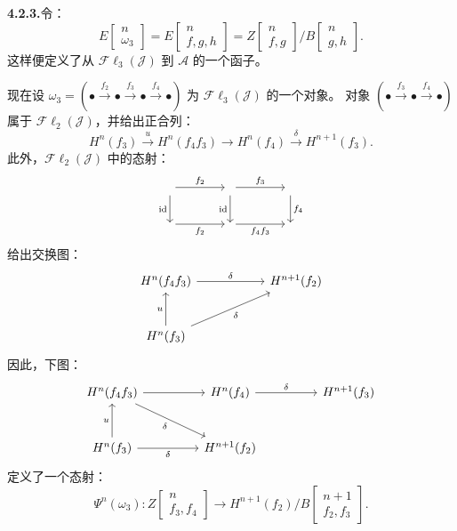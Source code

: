 \clearpage
{}%
\begingroup\small\setlength{\parskip}{0pt}\setlength{\emergencystretch}{1.5em}
\medskip\noindent\textbf{4.2.3.}\quad 令：
\[
E\!\left[\begin{smallmatrix}n\\\omega_3\end{smallmatrix}\right]
=E\!\left[\begin{smallmatrix}n\\f,g,h\end{smallmatrix}\right]
=Z\!\left[\begin{smallmatrix}n\\f,g\end{smallmatrix}\right]
\big/
B\!\left[\begin{smallmatrix}n\\g,h\end{smallmatrix}\right].
\tag{4.2.3.1}
\]
这样便定义了从 $\mathcal{F}\ell_3(\mathcal J)$ 到 $\mathcal A$ 的一个函子。

现在设
$\omega_3=(\mathord\bullet\xrightarrow{f_2}\mathord\bullet
\xrightarrow{f_3}\mathord\bullet\xrightarrow{f_4}\mathord\bullet)$
为 $\mathcal{F}\ell_3(\mathcal J)$ 的一个对象。
对象
$(\mathord\bullet\xrightarrow{f_3}\mathord\bullet\xrightarrow{f_4}\mathord\bullet)$
属于 $\mathcal{F}\ell_2(\mathcal J)$，并给出正合列：
\[
H^n(f_3)\xrightarrow u H^n(f_4f_3)\longrightarrow H^n(f_4)
\xrightarrow\delta H^{n+1}(f_3).
\]
此外，$\mathcal{F}\ell_2(\mathcal J)$ 中的态射：
\[
\begin{tikzcd}[column sep=4em,row sep=2.2em]
{}\arrow[r,"f_2"]\arrow[d,"\operatorname{id}"']&{}
 \arrow[r,"f_3"]\arrow[d,"\operatorname{id}"']&{}\arrow[d,"f_4"]\\
{}\arrow[r,"f_2"']&{}\arrow[r,"f_4f_3"']&{}
\end{tikzcd}
\]
给出交换图：
\[
\begin{tikzcd}[column sep=5.5em,row sep=2.7em]
H^n(f_4f_3)\arrow[r,"\delta"]&H^{n+1}(f_2)\\
H^n(f_3)\arrow[u,"u"]\arrow[ur,"\delta"']&{}
\end{tikzcd}
\]
因此，下图：
\[
\begin{tikzcd}[column sep=4.5em,row sep=2.7em]
H^n(f_4f_3)\arrow[r]\arrow[dr,"\delta"']&
H^n(f_4)\arrow[r,"\delta"]&H^{n+1}(f_3)\\
H^n(f_3)\arrow[u,"u"]\arrow[r,"\delta"']&H^{n+1}(f_2)&{}
\end{tikzcd}
\]
定义了一个态射：
\[
\Psi^n(\omega_3)\colon
Z\!\left[\begin{smallmatrix}n\\f_3,f_4\end{smallmatrix}\right]
\longrightarrow
H^{n+1}(f_2)\big/
B\!\left[\begin{smallmatrix}n+1\\f_2,f_3\end{smallmatrix}\right].
\]
\endgroup
